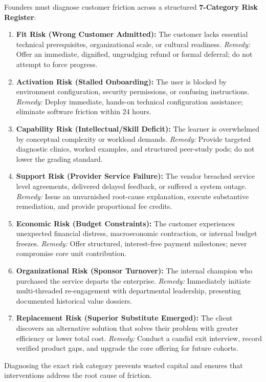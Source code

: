 Founders must diagnose customer friction across a structured \textbf{7-Category Risk Register}:
\begin{enumerate}[leftmargin=*]
\item \textbf{Fit Risk (Wrong Customer Admitted):} The customer lacks essential technical prerequisites, organizational scale, or cultural readiness. \textit{Remedy:} Offer an immediate, dignified, ungrudging refund or formal deferral; do not attempt to force progress.
\item \textbf{Activation Risk (Stalled Onboarding):} The user is blocked by environment configuration, security permissions, or confusing instructions. \textit{Remedy:} Deploy immediate, hands-on technical configuration assistance; eliminate software friction within 24 hours.
\item \textbf{Capability Risk (Intellectual/Skill Deficit):} The learner is overwhelmed by conceptual complexity or workload demands. \textit{Remedy:} Provide targeted diagnostic clinics, worked examples, and structured peer-study pods; do not lower the grading standard.
\item \textbf{Support Risk (Provider Service Failure):} The vendor breached service level agreements, delivered delayed feedback, or suffered a system outage. \textit{Remedy:} Issue an unvarnished root-cause explanation, execute substantive remediation, and provide proportional fee credits.
\item \textbf{Economic Risk (Budget Constraints):} The customer experiences unexpected financial distress, macroeconomic contraction, or internal budget freezes. \textit{Remedy:} Offer structured, interest-free payment milestones; never compromise core unit contribution.
\item \textbf{Organizational Risk (Sponsor Turnover):} The internal champion who purchased the service departs the enterprise. \textit{Remedy:} Immediately initiate multi-threaded re-engagement with departmental leadership, presenting documented historical value dossiers.
\item \textbf{Replacement Risk (Superior Substitute Emerged):} The client discovers an alternative solution that solves their problem with greater efficiency or lower total cost. \textit{Remedy:} Conduct a candid exit interview, record verified product gaps, and upgrade the core offering for future cohorts.
\end{enumerate}

Diagnosing the exact risk category prevents wasted capital and ensures that interventions address the root cause of friction.

